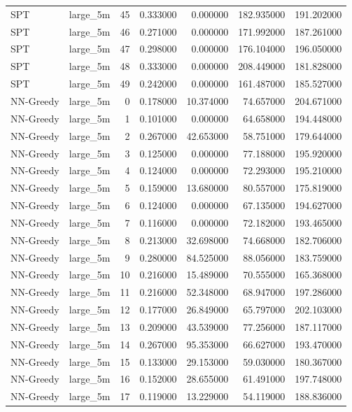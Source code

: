 \begin{tabular}{llrrrrr}
SPT & large_5m & 45 & 0.333000 & 0.000000 & 182.935000 & 191.202000 \\
SPT & large_5m & 46 & 0.271000 & 0.000000 & 171.992000 & 187.261000 \\
SPT & large_5m & 47 & 0.298000 & 0.000000 & 176.104000 & 196.050000 \\
SPT & large_5m & 48 & 0.333000 & 0.000000 & 208.449000 & 181.828000 \\
SPT & large_5m & 49 & 0.242000 & 0.000000 & 161.487000 & 185.527000 \\
NN-Greedy & large_5m & 0 & 0.178000 & 10.374000 & 74.657000 & 204.671000 \\
NN-Greedy & large_5m & 1 & 0.101000 & 0.000000 & 64.658000 & 194.448000 \\
NN-Greedy & large_5m & 2 & 0.267000 & 42.653000 & 58.751000 & 179.644000 \\
NN-Greedy & large_5m & 3 & 0.125000 & 0.000000 & 77.188000 & 195.920000 \\
NN-Greedy & large_5m & 4 & 0.124000 & 0.000000 & 72.293000 & 195.210000 \\
NN-Greedy & large_5m & 5 & 0.159000 & 13.680000 & 80.557000 & 175.819000 \\
NN-Greedy & large_5m & 6 & 0.124000 & 0.000000 & 67.135000 & 194.627000 \\
NN-Greedy & large_5m & 7 & 0.116000 & 0.000000 & 72.182000 & 193.465000 \\
NN-Greedy & large_5m & 8 & 0.213000 & 32.698000 & 74.668000 & 182.706000 \\
NN-Greedy & large_5m & 9 & 0.280000 & 84.525000 & 88.056000 & 183.759000 \\
NN-Greedy & large_5m & 10 & 0.216000 & 15.489000 & 70.555000 & 165.368000 \\
NN-Greedy & large_5m & 11 & 0.216000 & 52.348000 & 68.947000 & 197.286000 \\
NN-Greedy & large_5m & 12 & 0.177000 & 26.849000 & 65.797000 & 202.103000 \\
NN-Greedy & large_5m & 13 & 0.209000 & 43.539000 & 77.256000 & 187.117000 \\
NN-Greedy & large_5m & 14 & 0.267000 & 95.353000 & 66.627000 & 193.470000 \\
NN-Greedy & large_5m & 15 & 0.133000 & 29.153000 & 59.030000 & 180.367000 \\
NN-Greedy & large_5m & 16 & 0.152000 & 28.655000 & 61.491000 & 197.748000 \\
NN-Greedy & large_5m & 17 & 0.119000 & 13.229000 & 54.119000 & 188.836000 \\

\end{tabular}
